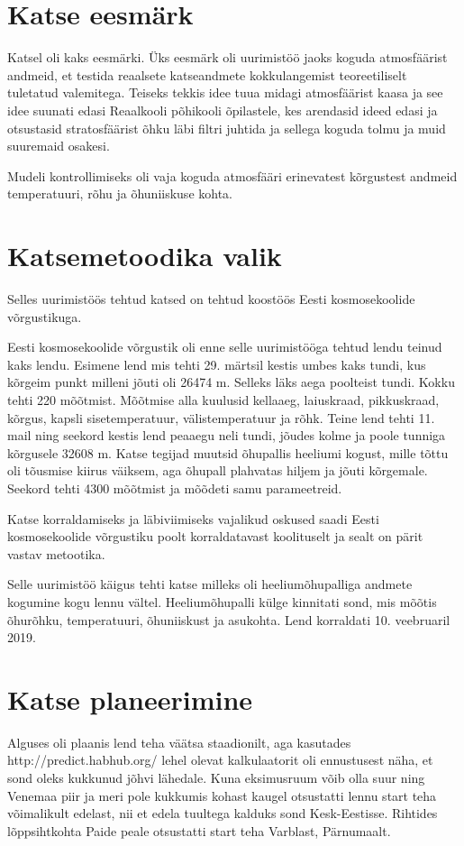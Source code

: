 \documentclass{trkut}%
\begin{document}
\section{Katse eesmärk}
Katsel oli kaks eesmärki. Üks eesmärk oli uurimistöö jaoks koguda atmosfäärist andmeid, et testida reaalsete katseandmete kokkulangemist teoreetiliselt tuletatud valemitega. Teiseks tekkis idee tuua midagi atmosfäärist kaasa ja see idee suunati edasi Reaalkooli põhikooli õpilastele, kes arendasid ideed edasi ja otsustasid stratosfäärist õhku läbi filtri juhtida ja sellega koguda tolmu ja muid suuremaid osakesi.

Mudeli kontrollimiseks oli vaja koguda atmosfääri erinevatest kõrgustest andmeid temperatuuri, rõhu ja õhuniiskuse kohta.

\section{Katsemetoodika valik}
Selles uurimistöös tehtud katsed on tehtud koostöös Eesti kosmosekoolide võrgustikuga.

Eesti kosmosekoolide võrgustik oli enne selle uurimistööga tehtud lendu teinud kaks lendu. Esimene lend mis tehti 29. märtsil kestis umbes kaks tundi, kus kõrgeim punkt milleni jõuti oli 26474 m. Selleks läks aega poolteist tundi. Kokku tehti 220 mõõtmist. Mõõtmise alla kuulusid kellaaeg, laiuskraad, pikkuskraad, kõrgus, kapsli sisetemperatuur, välistemperatuur ja rõhk. Teine lend tehti 11. mail ning seekord kestis lend peaaegu neli tundi, jõudes kolme ja poole tunniga kõrgusele 32608 m. Katse tegijad muutsid õhupallis heeliumi kogust, mille tõttu oli tõusmise kiirus väiksem, aga õhupall plahvatas hiljem ja jõuti kõrgemale. Seekord tehti 4300 mõõtmist ja mõõdeti samu parameetreid.

Katse korraldamiseks ja läbiviimiseks vajalikud oskused saadi Eesti kosmosekoolide võrgustiku poolt korraldatavast koolituselt ja sealt on pärit vastav metootika.

Selle uurimistöö käigus tehti katse milleks oli heeliumõhupalliga andmete kogumine kogu lennu vältel. Heeliumõhupalli külge kinnitati sond, mis mõõtis õhurõhku, temperatuuri, õhuniiskust ja asukohta. Lend korraldati 10. veebruaril 2019.

\section{Katse planeerimine}
Alguses oli plaanis lend teha väätsa staadionilt, aga kasutades http://predict.habhub.org/ lehel olevat kalkulaatorit oli ennustusest näha, et sond oleks kukkunud jõhvi lähedale. Kuna eksimusruum võib olla suur ning Venemaa piir ja meri pole kukkumis kohast kaugel otsustatti lennu start teha võimalikult edelast, nii et edela tuultega kalduks sond Kesk-Eestisse. Rihtides lõppsihtkohta Paide peale otsustatti start teha Varblast, Pärnumaalt.
\end{document}
